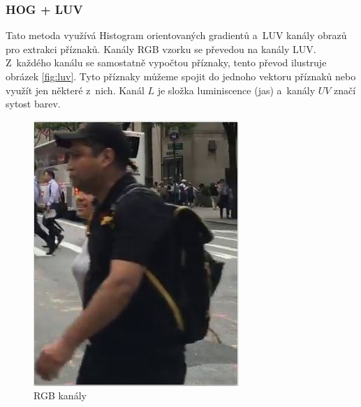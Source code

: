 \subsubsection*{HOG + LUV}
Tato metoda využívá Histogram orientovaných gradientů a~LUV kanály obrazů pro extrakci příznaků. Kanály RGB vzorku se převedou na kanály LUV. Z~každého kanálu se samostatně vypočtou příznaky, tento převod ilustruje obrázek \ref{fig:luv}. Tyto příznaky můžeme spojit do jednoho vektoru příznaků nebo využít jen některé z~nich. Kanál $L$ je složka luminiscence (jas) a~kanály $UV$ značí sytost barev. 

\begin{figure}[H]
\centering
\begin{minipage}[b]{.3\textwidth}
  \centering
  \includegraphics[width=.8\linewidth]{figures/rgb_luv}
  \caption*{RGB kanály}
\end{minipage}%
\begin{minipage}[b]{.3\textwidth}
  \centering

\end{minipage}
\end{figure}

